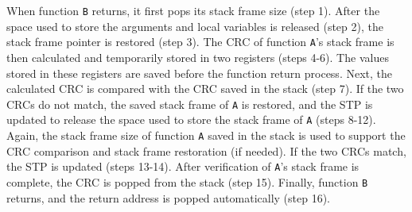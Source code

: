 When function \texttt{B} returns, it first pops its stack frame size (step 1). After the space used to store the arguments and local variables is released (step 2), the stack frame pointer is restored (step 3). The CRC of function \texttt{A}'s stack frame is then calculated and temporarily stored in two registers (steps 4-6). The values stored in these registers are saved before the function return process. Next, the calculated CRC is compared with the CRC saved in the stack (step 7). If the two CRCs do not match, the saved stack frame of \texttt{A} is restored, and the STP is updated to release the space used to store the stack frame of \texttt{A} (steps 8-12). Again, the stack frame size of function \texttt{A} saved in the stack is used to support the CRC comparison and stack frame restoration (if needed). If the two CRCs match, the STP is updated (steps 13-14). After verification of \texttt{A}'s stack frame is complete, the CRC is popped from the stack (step 15). Finally, function \texttt{B} returns, and the return address is popped automatically (step 16).
